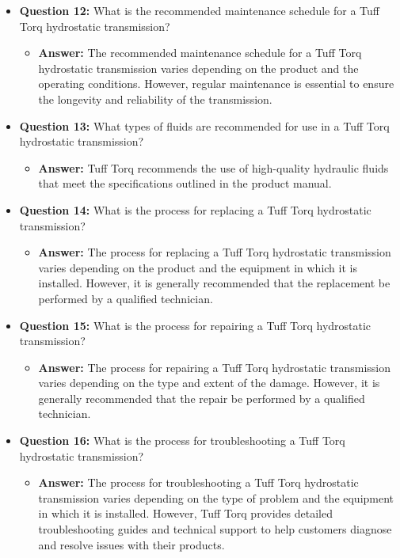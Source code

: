 \documentclass{article}
\begin{document}
\begin{itemize}
    \item \textbf{Question 12:} What is the recommended maintenance schedule for a Tuff Torq hydrostatic transmission?
    \begin{itemize}
        \item \textbf{Answer:} The recommended maintenance schedule for a Tuff Torq hydrostatic transmission varies depending on the product and the operating conditions. However, regular maintenance is essential to ensure the longevity and reliability of the transmission.
    \end{itemize}
    
    \item \textbf{Question 13:} What types of fluids are recommended for use in a Tuff Torq hydrostatic transmission?
    \begin{itemize}
        \item \textbf{Answer:} Tuff Torq recommends the use of high-quality hydraulic fluids that meet the specifications outlined in the product manual.
    \end{itemize}
    
    \item \textbf{Question 14:} What is the process for replacing a Tuff Torq hydrostatic transmission?
    \begin{itemize}
        \item \textbf{Answer:} The process for replacing a Tuff Torq hydrostatic transmission varies depending on the product and the equipment in which it is installed. However, it is generally recommended that the replacement be performed by a qualified technician.
    \end{itemize}
    
    \item \textbf{Question 15:} What is the process for repairing a Tuff Torq hydrostatic transmission?
    \begin{itemize}
        \item \textbf{Answer:} The process for repairing a Tuff Torq hydrostatic transmission varies depending on the type and extent of the damage. However, it is generally recommended that the repair be performed by a qualified technician.
    \end{itemize}
    
    \item \textbf{Question 16:} What is the process for troubleshooting a Tuff Torq hydrostatic transmission?
    \begin{itemize}
        \item \textbf{Answer:} The process for troubleshooting a Tuff Torq hydrostatic transmission varies depending on the type of problem and the equipment in which it is installed. However, Tuff Torq provides detailed troubleshooting guides and technical support to help customers diagnose and resolve issues with their products.
    \end{itemize}
    

\end{itemize}
\end{document}
